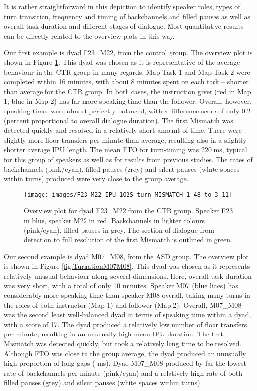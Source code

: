 It is rather straightforward in this depiction to identify speaker roles, types of turn transition, frequency and timing of backchannels and filled pauses as well as overall task duration and different stages of dialogue. Most quantitative results can be directly related to the overview plots in this way.

Our first example is dyad F23\_M22, from the control group. The overview plot is shown in Figure \ref{fig:TurnationF23M22}.
This dyad was chosen as it is representative of the average behaviour in the CTR group in many regards. Map Task 1 and Map Task 2 were completed within 16 minutes, with about 8 minutes spent on each task -- shorter than average for the CTR group. In both cases, the instruction giver (red in Map 1; blue in Map 2) has far more speaking time than the follower. Overall, however, speaking times were almost perfectly balanced, with a difference score of only 0.2 (percent proportional to overall dialogue duration).
The first Mismatch was detected quickly and resolved in a relatively short amount of time.
There were slightly more floor transfers per minute than average, resulting also in a slightly shorter average IPU length. The mean FTO for turn-timing was 220 ms, typical for this group of speakers as well as for results from previous studies. The rates of backchannels (pink/cyan), filled pauses (grey) and silent pauses (white spaces within turns) produced were very close to the group average.



\begin{figure}

{\centering \texttt{[image: images/F23\_M22\_IPU\_1O2S\_turn\_MISMATCH\_1\_48\_to\_3\_11]} 
	
}

\caption{Overview plot for dyad F23\_M22 from the CTR group. Speaker F23 in blue, speaker M22 in red. Backchannels in lighter colours (pink/cyan), filled pauses in grey. The section of dialogue from detection to full resolution of the first Mismatch is outlined in green.}\label{fig:TurnationF23M22}
\end{figure}

	
	Our second example is dyad M07\_M08, from the ASD group. The overview plot is shown in Figure \ref{fig:TurnationM07M08}.
	This dyad was chosen as it represents relatively unusual behaviour along several dimensions. Here, overall task duration was very short, with a total of only 10 minutes. Speaker M07 (blue lines) has considerably more speaking time than speaker M08 overall, taking many turns in the roles of both instructor (Map 1) and follower (Map 2). Overall, M07\_M08 was the second least well-balanced dyad in terms of speaking time within a dyad, with a score of 17. The dyad produced a relatively low number of floor transfers per minute, resulting in an unusually high mean IPU duration.
	The first Mismatch was detected quickly, but took a relatively long time to be resolved.
	Although FTO was close to the group average, the dyad produced an unusually high proportion of long gaps ( ms).
	Dyad M07\_M08 produced by far the lowest rate of backchannels per minute (pink/cyan) and a relatively high rate of both filled pauses (grey) and silent pauses (white spaces within turns).
	
